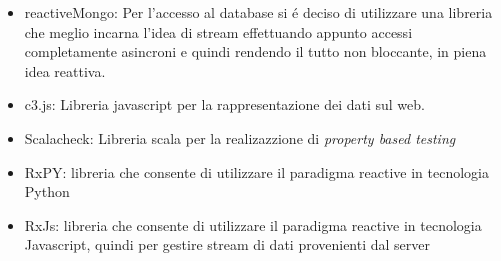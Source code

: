 \begin{itemize}
 \item {reactiveMongo:} Per l'accesso al database si \'e deciso di utilizzare una libreria che meglio incarna l'idea di stream effettuando appunto accessi completamente asincroni e quindi rendendo il tutto non bloccante, in piena idea reattiva.\cite{ReactiveMongo}
 \item {c3.js:} Libreria javascript per la rappresentazione dei dati sul web. \cite{C3JS}
 \item {Scalacheck:} Libreria scala per la realizazzione di \textit{property based testing} \cite{Scalacheck}
 \item {RxPY:} libreria che consente di utilizzare il paradigma reactive in tecnologia Python \cite{RxPy}
 \item {RxJs:} libreria che consente di utilizzare il paradigma reactive in tecnologia Javascript, quindi per gestire stream di dati provenienti dal server \cite{RxJs}
\end{itemize}
